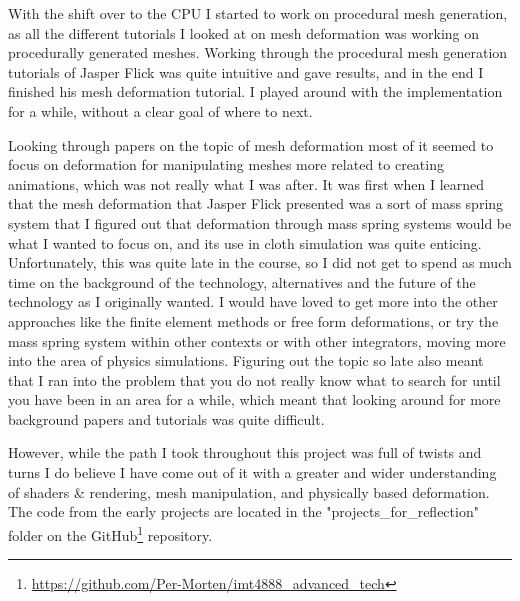 With the shift over to the CPU I started to work on procedural mesh generation, as all the different tutorials I looked at
on mesh deformation was working on procedurally generated meshes. Working through the procedural mesh generation tutorials
of Jasper Flick was quite intuitive and gave results, and in the end I finished his mesh deformation tutorial.
I played around with the implementation for a while, without a clear goal of where to next.

Looking through papers on the topic of mesh deformation most of it seemed to focus on deformation for manipulating meshes more related to creating animations,
which was not really what I was after. 
It was first when I learned that the mesh deformation that Jasper Flick\cite{catlike_mesh_deformation} presented was a sort of mass spring system
that I figured out that deformation through mass spring systems would be what I wanted to focus on, and its use in cloth simulation was quite enticing.
Unfortunately, this was quite late in the course, so I did not get to spend as much time on the background of the technology, alternatives
and the future of the technology as I originally wanted.
I would have loved to get more into the other approaches like the finite element methods or free form deformations, or try the mass spring system
within other contexts or with other integrators, moving more into the area of physics simulations.
Figuring out the topic so late also meant that I ran into the problem that you do not really know what to search for until you have been in an area for a while,
which meant that looking around for more background papers and tutorials was quite difficult.

However, while the path I took throughout this project was full of twists and turns I do believe I have come out of it with a greater and wider understanding of
shaders \& rendering, mesh manipulation, and physically based deformation.
The code from the early projects are located in the "projects\_for\_reflection" folder on the GitHub\footnote{\url{https://github.com/Per-Morten/imt4888_advanced_tech}} repository.
